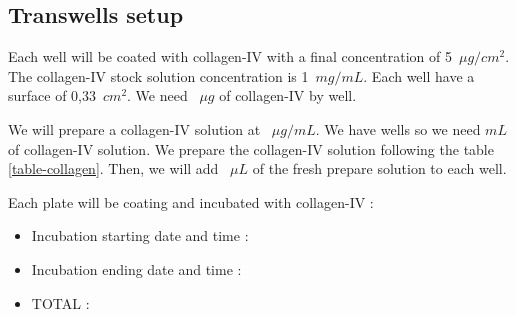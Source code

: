 \subsection{Transwells setup}

Each well will be coated with collagen-IV with a final concentration of 5~$\mu g/cm^2$. The collagen-IV stock solution concentration is 1~$mg/mL$. Each well have a surface of 0,33~$cm^2$. We need ~$\mu g$ of collagen-IV by well.


We will prepare a collagen-IV solution at ~$\mu g/mL$. We have  wells so we need  $mL$ of collagen-IV solution. We prepare the collagen-IV solution following the table \ref{table-collagen}. Then, we will add ~$\mu L$ of the fresh prepare solution to each well.


\begin{table}[H]
\caption{Collagen-IV dilution}
\label{table-collagen}
\end{table}

Each plate will be coating and incubated with collagen-IV :

\begin{itemize}
\item Incubation starting date and time : 
\item Incubation ending date and time : 
\item TOTAL : 
\end{itemize}
